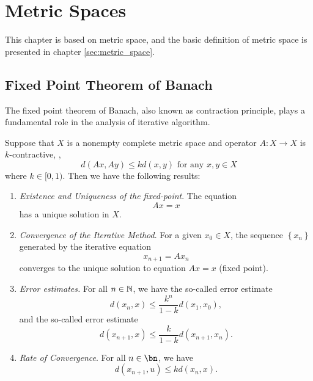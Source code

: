 \chapter{Metric Spaces}
This chapter is based on metric space, and the basic definition of 
metric space is presented in chapter \ref{sec:metric_space}.

\section{Fixed Point Theorem of Banach}
The fixed point theorem of Banach, also known as 
contraction principle, plays a fundamental role in
the analysis of iterative algorithm. 

\begin{thm}
\label{thm:metric_spaces:fixed_point_theorem_of_banach}
Suppose that $X$ is a nonempty complete metric space and 
operator $A: X \to X$ is $k$-contractive, \ie, 
\begin{equation}
d(Ax, Ay) \le kd(x, y) \text{  for any } x, y \in X
\end{equation}
where $k \in [0, 1)$. Then we have the following results:
\begin{enumerate}
\item \emph{Existence and Uniqueness of the fixed-point}. 
\label{thm:metric_spaces:fixed_point:existence_uniqueness}
The equation 
\begin{equation}
Ax = x
\end{equation}
has a unique solution in $X$.
\item \emph{Convergence of the Iterative Method}. 
\label{thm:metric_spaces:fixed_point:convergence}
For a given $x_0 \in X$, the sequence $\left\{ x_n \right\}$ generated 
by the iterative equation 
\begin{equation*}
    x_{n+1} = Ax_n
\end{equation*}
converges to the unique solution to equation $Ax = x$ (fixed point). 
\item \emph{Error estimates.}
\label{thm:metric_spaces:fixed_point:error}
For all $n \in \mathbb{N}$, we have the so-called \apri error estimate 
\begin{equation}
    \label{equ:metric_spaces:fixed_point:apriori_error}
    d(x_n, x) \le \frac{k^n}{1-k} d(x_1, x_0), 
\end{equation}
and the so-called \apost error estimate 
\begin{equation}
    \label{equ:metric_spaces:fixed_point:aposterior_error}
    d(x_{n+1}, x) \le \frac{k}{1-k} d(x_{n+1}, x_n). 
\end{equation}
\item \emph{Rate of Convergence}.
\label{thm:metric_spaces:fixed_point:convergent_rate}
For all $n \in \bn$, we have 
\begin{equation*}
    d(x_{n+1}, u) \le k d(x_n, x). 
\end{equation*}
\end{enumerate}
\end{thm}

